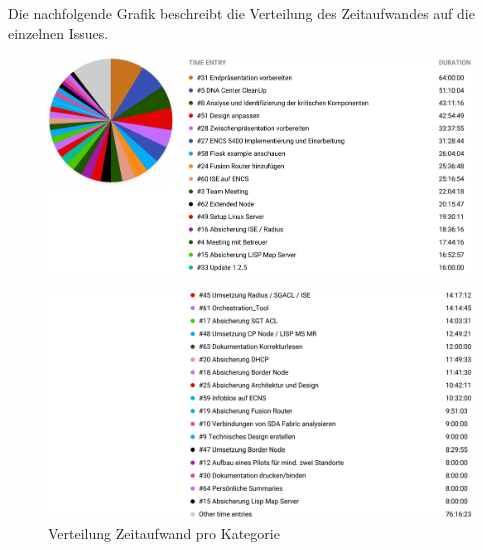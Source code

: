 Die nachfolgende Grafik beschreibt die Verteilung des Zeitaufwandes auf die einzelnen Issues.

\begin{figure}[H]
	\centering
	\includegraphics[width=1\linewidth]{img/Zeitmanagement/timeentry}
\end{figure}

\begin{figure}[H]
	\centering
	\includegraphics[width=1\linewidth]{img/Zeitmanagement/timeentry2}
	\caption{Verteilung Zeitaufwand pro Kategorie}
	\label{fig:Verteilung Zeitaufwand pro Kategorie}
\end{figure}